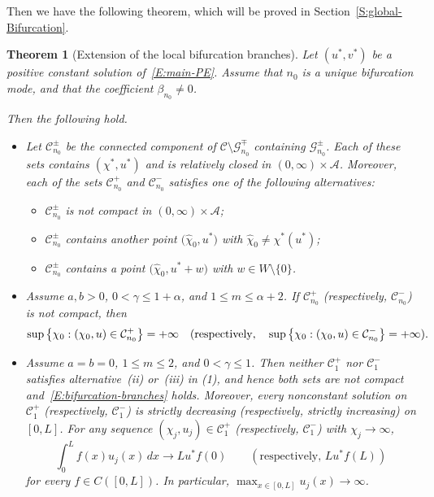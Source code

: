 \documentclass[11pt]{article} %
\newtheorem{theorem}{Theorem}[section] %
\theoremstyle{remark}
\theoremstyle{remark}
\numberwithin{equation}{section}
\numberwithin{figure}{section}
\numberwithin{table}{section}
\begin{document}
Then we have the following theorem, which will be proved in
Section~\ref{S:global-Bifurcation}.
\begin{theorem}[Extension of the local bifurcation branches]\label{T:global-extension}
  Let $(u^*,v^*)$ be a positive constant solution of~\eqref{E:main-PE}. Assume
  that $n_0$ is a unique bifurcation mode, and that the coefficient
  $\beta_{n_0}\not = 0$.

  Then the following hold.
  \begin{itemize}
    \item[(1)]
      Let $\mathcal{C}_{n_0}^{\pm}$ be the connected component of
      $\mathcal{C}\setminus\mathcal{G}_{n_0}^{\mp}$ containing
      $\mathcal{G}_{n_0}^{\pm}$. Each of these sets contains $(\chi^*,u^*)$ and
      is relatively closed in $(0, \infty)\times\mathcal{A}$. Moreover, each of
      the sets $\mathcal{C}_{n_0}^{+}$ and $\mathcal{C}_{n_0}^{-}$ satisfies one
      of the following alternatives:
      \begin{itemize}
        \item[(i)] $\mathcal{C}_{n_0}^{\pm}$ is not compact in $(0,
          \infty)\times\mathcal{A}$;
        \item[(ii)] $\mathcal{C}_{n_0}^{\pm}$ contains another point
          $\bigl(\widehat{\chi}_0, u^*\bigr)$ with $\widehat{\chi}_0 \ne
          \chi^*(u^*)$;
        \item[(iii)] $\mathcal{C}_{n_0}^{\pm}$ contains a point
          $\bigl(\widehat{\chi}_0, u^* + w\bigr)$ with $w \in W\setminus\{0\}$.
      \end{itemize}

    \item[(2)]  Assume $a, b > 0$, $0 < \gamma \le 1 + \alpha$, and ${1\le m\le
      \alpha+2}$. If $\mathcal{C}_{n_0}^{+}$ (respectively,
      $\mathcal{C}_{n_0}^{-}$) is not compact, then
      \begin{align}\label{E:bifurcation-branches}
        \sup\left\{ \chi_0:(\chi_0,u)\in\mathcal{C}_{n_0}^{+}
        \right\}=+\infty\quad {\rm (respectively,} \quad  \sup\left\{
        \chi_0:(\chi_0,u)\in\mathcal{C}_{n_0}^{-} \right\}=+\infty).
      \end{align}

    \item[(3)]  Assume $a = b = 0$, ${1\le m\le 2}$, and $0 < \gamma \le 1$.
      Then neither $\mathcal{C}_1^{+}$ nor $\mathcal{C}_1^{-}$ satisfies
      alternative~(ii) or~(iii) in (1), and hence both sets are not compact
      and~\eqref{E:bifurcation-branches} holds. Moreover, every nonconstant
      solution on $\mathcal{C}_1^+$ (respectively, $\mathcal{C}_1^-$) is
      strictly decreasing (respectively, strictly increasing) on $[0, L]$. For
      any sequence $(\chi_j,u_j) \in \mathcal{C}_1^+$ (respectively,
      $\mathcal{C}_1^-$) with $\chi_j \to \infty$,
      \[
        \int_0^L f(x)u_j(x)\,dx \longrightarrow Lu^*f(0)
        \qquad
        \left(\text{respectively, }Lu^*f(L)\right)
      \]
      for every $f \in C([0, L])$. In particular, $\max_{x\in[0, L]}u_j(x) \to
      \infty$.
  \end{itemize}
\end{theorem}
\end{document}

